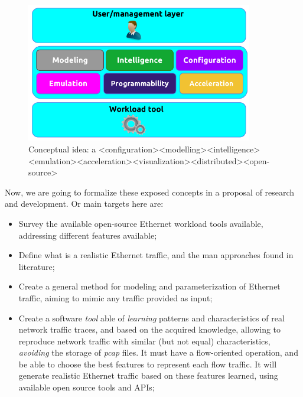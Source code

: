 \begin{figure}[ht!]
        \centering
        \includegraphics[height=2.4in]{figures/ch1/layer-diagram}
        \caption{ Conceptual idea: a <configuration><modelling><intelligence><emulation><acceleration><visualization><distributed><open-source>}
    \label{fig:layer-diagram}
\end{figure}

Now, we are going to formalize these exposed concepts in a proposal of research and development. Or main targets here are:

\begin{itemize}

\item Survey the available open-source Ethernet workload tools available, addressing different features available;

\item Define what is a realistic Ethernet traffic, and the man approaches found in literature;

\item Create a general method for modeling and parameterization of Ethernet traffic, aiming to mimic any traffic provided as input;

\item Create a software \textit{tool} able of \textit{learning} patterns and characteristics of real network traffic traces, and based on the acquired knowledge, allowing to reproduce network traffic with similar (but not equal) characteristics, \textit{avoiding} the storage of \textit{pcap} files. It must have a flow-oriented operation, and be able to choose the best features to represent each flow traffic. It will generate realistic Ethernet traffic based on these features learned, using available open source tools and APIs;


\end{itemize}

